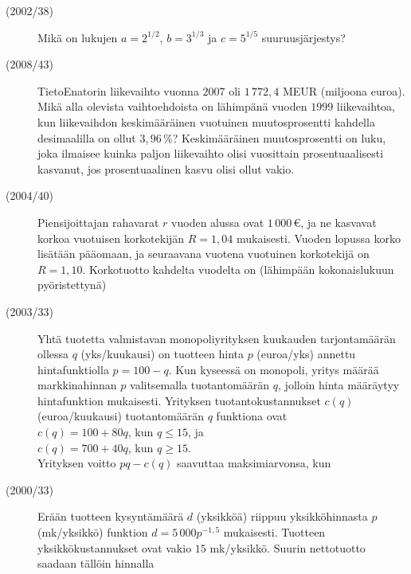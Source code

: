 \begin{description}
	\item[(2002/38)] Mikä on lukujen $a=2^{1/2}$, $b=3^{1/3}$ ja $c=5^{1/5}$ suuruusjärjestys?
        


	\item[(2008/43)] TietoEnatorin liikevaihto vuonna $2007$ oli $1\,772,4$ MEUR (miljoona euroa). Mikä
	alla olevista vaihtoehdoista on lähimpänä vuoden $1999$ liikevaihtoa, kun
	liikevaihdon keskimääräinen vuotuinen muutosprosentti kahdella desimaalilla on
	ollut $3,96$\,\%? Keskimääräinen muutosprosentti on luku, joka ilmaisee kuinka paljon
	liikevaihto olisi vuosittain prosentuaalisesti kasvanut, jos prosentuaalinen kasvu olisi
	ollut vakio.
        


	\item[(2004/40)] Piensijoittajan rahavarat $r$ vuoden alussa ovat $1\,000$\,€, ja ne kasvavat korkoa vuotuisen korkotekijän $R=1,04$ mukaisesti. Vuoden lopussa korko lisätään pääomaan, ja seuraavana vuotena vuotuinen korkotekijä on $R=1,10$. Korkotuotto kahdelta vuodelta on (lähimpään kokonaislukuun pyöristettynä)
        


	\item[(2003/33)] Yhtä tuotetta valmistavan monopoliyrityksen kuukauden tarjontamäärän ollessa $q$ (yks/kuukausi) on tuotteen hinta $p$ (euroa/yks) annettu hintafunktiolla $p = 100-q$. Kun kyseessä on monopoli, yritys määrää markkinahinnan $p$ valitsemalla tuotantomäärän $q$, jolloin hinta määräytyy hintafunktion mukaisesti. Yrityksen tuotantokustannukset $c(q)$ (euroa/kuukausi) tuotantomäärän $q$ funktiona ovat\\
$c(q)=100+80q$, kun $q\leq 15$, ja\\
$c(q)=700+40q$, kun $q\geq 15$.\\
Yrityksen voitto $pq-c(q)$ saavuttaa maksimiarvonsa, kun
        


	\item[(2000/33)] Erään tuotteen kysyntämäärä $d$ (yksikköä) riippuu yksikköhinnasta $p$ (mk/yksikkö) funktion $d=5\,000p^{-1{,}5}$ mukaisesti. Tuotteen yksikkökustannukset ovat vakio $15$ mk/yksikkö. Suurin nettotuotto saadaan tällöin hinnalla
        

	
\end{description}
